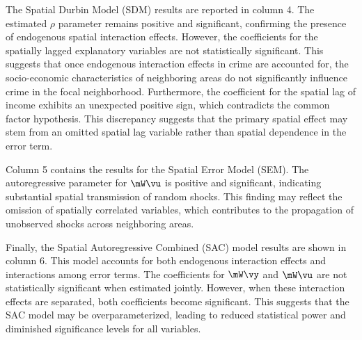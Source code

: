 \documentclass[english,12pt]{book}\usepackage[]{graphicx}\usepackage[]{xcolor}
\begin{document}
The Spatial Durbin Model (SDM) results are reported in column 4. The estimated \(\rho\) parameter remains positive and significant, confirming the presence of endogenous spatial interaction effects. However, the coefficients for the spatially lagged explanatory variables are not statistically significant. This suggests that once endogenous interaction effects in crime are accounted for, the socio-economic characteristics of neighboring areas do not significantly influence crime in the focal neighborhood. Furthermore, the coefficient for the spatial lag of income exhibits an unexpected positive sign, which contradicts the common factor hypothesis. This discrepancy suggests that the primary spatial effect may stem from an omitted spatial lag variable rather than spatial dependence in the error term.

Column 5 contains the results for the Spatial Error Model (SEM). The autoregressive parameter for \(\mW\vu\) is positive and significant, indicating substantial spatial transmission of random shocks. This finding may reflect the omission of spatially correlated variables, which contributes to the propagation of unobserved shocks across neighboring areas.

Finally, the Spatial Autoregressive Combined (SAC) model results are shown in column 6. This model accounts for both endogenous interaction effects and interactions among error terms. The coefficients for \(\mW\vy\) and \(\mW\vu\) are not statistically significant when estimated jointly. However, when these interaction effects are separated, both coefficients become significant. This suggests that the SAC model may be overparameterized, leading to reduced statistical power and diminished significance levels for all variables.
\end{document}
